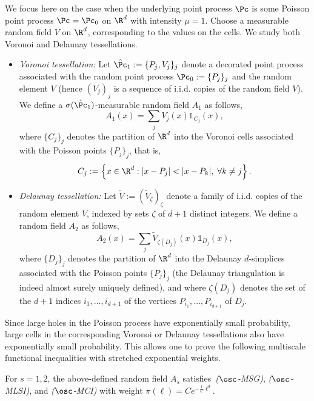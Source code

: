 We focus here on the case when the underlying point process $\Pc$ is some Poisson point process $\Pc=\Pc_0$ on $\R^d$ with intensity $\mu=1$. Choose a measurable random field $V$ on $\R^d$, corresponding to the values on the cells. We study both Voronoi and Delaunay tessellations.
\begin{itemize}
\item \emph{Voronoi tessellation:} Let $\hat\Pc_1:=\{P_j,V_j\}_j$ denote a decorated point process associated with the random point process $\Pc_0:=\{P_j\}_j$ and the random element $V$ (hence $(V_j)_j$ is a sequence of i.i.d. copies of the random field $V$). We define a $\sigma(\hat\Pc_1)$-measurable random field $A_1$ as follows,
\[
A_1(x)=\sum_jV_j(x)\mathds1_{C_j}(x),
\]
where $\{C_j\}_j$ denotes the partition of $\R^d$ into the Voronoi cells associated with the Poisson points $\{P_j\}_j$, that is,
\[
C_j:=\left\{x\in\R^d:|x-P_j|<|x-P_k|,\;\forall k\ne j\right\}.
\]
\item \emph{Delaunay tessellation:} Let $\tilde V:=(\tilde V_\zeta)_\zeta$ denote a family of i.i.d. copies of the random element $V$, indexed by sets $\zeta$ of $d+1$ distinct integers. We define a random field $A_2$ as follows,
\[
A_2(x)=\sum_j \tilde V_{\zeta(D_j)}(x)\mathds1_{D_j}(x),
\]
where $\{D_j\}_j$ denotes the partition of $\R^d$ into the Delaunay $d$-simplices associated with the Poisson points $\{P_j\}_j$ (the Delaunay triangulation is indeed almost surely uniquely defined), and where $\zeta(D_j)$ denotes the set of the $d+1$ indices $i_1,\dots,i_{d+1}$ of the vertices $P_{i_1},\dots,P_{i_{d+1}}$ of $D_j$.
\end{itemize}

Since large holes in the Poisson process have exponentially small probability, large cells in the corresponding Voronoi or Delaunay tessellations also have exponentially small probability. This allows one to prove the following multiscale functional \linebreak inequalities with stretched exponential weights.

\begin{prop}\label{prop:voronoi}
For $s=1,2$, the above-defined random field $A_s$ satisfies~\emph{($\osc$-MSG)}, \emph{($\osc$-MLSI)}, and \emph{($\osc$-MCI)} with weight $\pi(\ell)=Ce^{-\frac1C\ell^d}$.
\end{prop}


